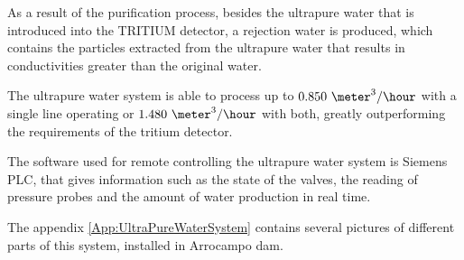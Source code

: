 As a result of the purification process, besides the ultrapure water that is introduced into the TRITIUM detector, a rejection water is produced,  which contains the particles extracted from the ultrapure water that results in conductivities greater than the original water.

The ultrapure water system is able to process up to $0.850~\meter^3/\hour$ with a single line operating or $1.480~\meter^3/\hour$ with both, greatly outperforming the requirements of the tritium detector. 

The software used for remote controlling the ultrapure water system is Siemens PLC, that gives information such as the state of the valves, the reading of pressure probes and the amount of water production in real time. 

The appendix \ref{App:UltraPureWaterSystem} contains several pictures of different parts of this system, installed in Arrocampo dam.